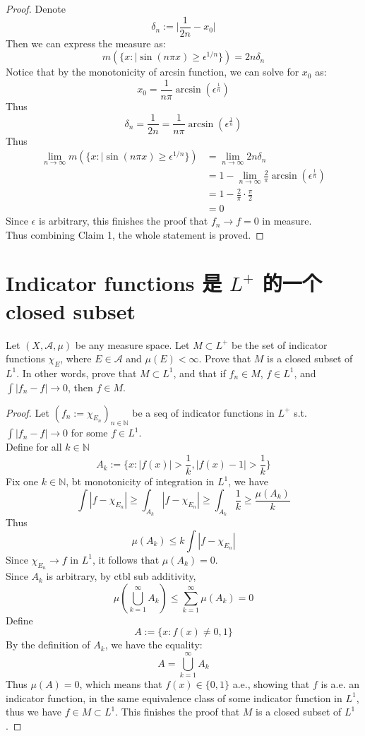 \documentclass[lang=cn,11pt]{elegantbook}
\begin{document}
\begin{proof}
Denote \[
\delta_n :=\Big |\frac{1}{2n} - x_0 \Big| 
\]
Then we can express the measure as: \[
m(\{ x: |\sin (n \pi x) \geq \epsilon^{1/n}  \}) = 2n  \delta_n
\]
Notice that by the monotonicity of arcsin function, we can solve for $x_0$ as:\[
x_0  =\frac{1}{n\pi} \arcsin (\epsilon^\frac{1}{n})
\]
Thus \[
\delta_n = \frac{1}{2n} = \frac{1}{n\pi} \arcsin (\epsilon^\frac{1}{n})
\]
Thus  \begin{align}
\lim_{n\to \infty}m(\{ x: |\sin (n \pi x) \geq \epsilon^{1/n}  \}) &=  \lim_{n\to\infty} 2n  \delta_n     \\
&= 1-  \lim_{n\to\infty}  \frac{2}{\pi}\arcsin (\epsilon^\frac{1}{n}) \\
&= 1-\frac{2}{\pi} \cdot \frac{\pi}{2} \\
&=0
\end{align}
Since $\epsilon$ is arbitrary, this finishes the proof that $f_n \to f = 0$ in measure.\\
Thus combining Claim 1, the whole statement is proved.
\end{proof}





\section{Indicator functions 是 $L^+$ 的一个 closed subset}
  Let $(X,\mathcal{A},\mu)$ be any measure space. Let $M\subset L^+$ be the set of indicator functions $\chi_E$, where $E\in\mathcal{A}$ and $\mu(E)<\infty$. Prove that $M$ is a closed subset of $L^1$. In other words, prove that $M\subset L^1$, and that if $f_n\in M$, $f\in L^1$, and $\int|f_n-f|\to0$, then $f\in M$.

\begin{proof}
Let $(f_n := \chi_{E_n})_{n\in\mathbb{N}}$ be a seq of indicator functions in $L^+$ s.t. $\int|f_n-f|\to0$ for some $f\in L^1$.  \\
Define for all $k\in \mathbb{N}$ $$
A_k :=\{x\colon |f(x)|>\frac{1}{k},|f(x)-1|>\frac{1}{k}\}
$$
Fix one $k\in\mathbb{N}$, bt monotonicity of integration in $L^1$, we have
$$\int|f-\chi_{E_n}|\geq \int_{A_k}|f-\chi_{E_n}|\geq   \int_{A_k} \frac{1}{k}   \geq     \frac{\mu(A_k)}{k}$$
Thus \[
\mu(A_k) \leq k \int |f-\chi_{E_n}|
\]
Since $\chi_{E_n}\to f$ in $L^1$, it follows that $\mu(A_k)=0$.\\
Since $A_k$ is arbitrary, by ctbl sub additivity, \[
\mu(\bigcup_{k=1}^{\infty}A_k) \leq \sum_{k=1}^{\infty}\mu(A_k)= 0 
\]
Define \[
A:=\{x\colon f(x)\not=0,1\}
\]
By the definition of $A_k$, we have the equality: \[
A=\bigcup_{k=1}^{\infty}A_k
\]
Thus $\mu(A) = 0$, which means that $f(x)\in\{0,1\}$ a.e., showing that $f$ is a.e. an indicator function, in the same equivalence class of some indicator function in $L^1$, thus we have $f \in M \subset L^1$. This finishes the proof that $M$ is a closed subset of $L^1$.
\end{proof}
\end{document}
